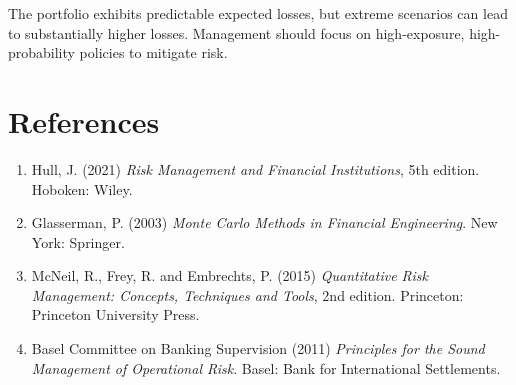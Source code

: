 \documentclass[12pt,a4paper]{article}
\begin{document}
The portfolio exhibits predictable expected losses, but extreme scenarios can lead to substantially higher losses. 
Management should focus on high-exposure, high-probability policies to mitigate risk.

\newpage  %
\section*{References}

\begin{enumerate}
    \item Hull, J. (2021) \textit{Risk Management and Financial Institutions}, 5th edition. Hoboken: Wiley.
    \item Glasserman, P. (2003) \textit{Monte Carlo Methods in Financial Engineering}. New York: Springer.
    \item McNeil, R., Frey, R. and Embrechts, P. (2015) \textit{Quantitative Risk Management: Concepts, Techniques and Tools}, 2nd edition. Princeton: Princeton University Press.

    \item Basel Committee on Banking Supervision (2011) \textit{Principles for the Sound Management of Operational Risk}. Basel: Bank for International Settlements.
\end{enumerate}
\end{document}

